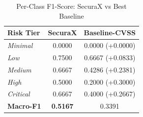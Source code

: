 \begin{table}[htbp]
\centering
\caption{Per-Class F1-Score: SecuraX vs Best Baseline}
\label{tab:per_class_f1}
\begin{tabular}{lcc}
\hline
\textbf{Risk Tier} & \textbf{SecuraX} & \textbf{Baseline-CVSS} \\
\hline
\textit{Minimal} & 0.0000 & 0.0000 (+0.0000) \\
\textit{Low} & 0.7500 & 0.6667 (+0.0833) \\
\textit{Medium} & 0.6667 & 0.4286 (+0.2381) \\
\textit{High} & 0.5000 & 0.2000 (+0.3000) \\
\textit{Critical} & 0.6667 & 0.4000 (+0.2667) \\
\hline
\textbf{Macro-F1} & \textbf{0.5167} & 0.3391 \\
\hline
\end{tabular}
\end{table}